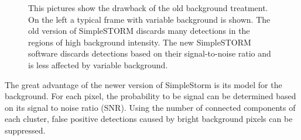 \begin{figure}
\hfill
{}\hfill	
{}

\caption{This pictures show the drawback of the old background treatment. On the left a typical frame with variable background is shown. The old version of SimpleSTORM discards many detections in the regions of high background intensity. The new SimpleSTORM software discards detections based on their signal-to-noise ratio and is less affected by variable background.}
\label{bgmakesitbad}	

\end{figure}

The great advantage of the newer version of SimpleStorm is its model for the background. For each pixel, the probability to be signal can be determined based on its signal to noise ratio (SNR). Using the number of connected components of each cluster, false positive detections caused by bright background pixels can be suppressed.

